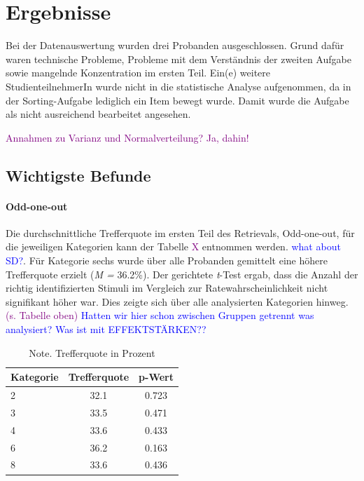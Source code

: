 \documentclass[preprint,12pt]{elsarticle}
\begin{document}
\section{Ergebnisse}
\label{S:3}
Bei der Datenauswertung wurden drei Probanden ausgeschlossen. Grund dafür waren technische Probleme, Probleme mit dem Verständnis der zweiten Aufgabe sowie mangelnde Konzentration im ersten Teil.
Ein(e) weitere StudienteilnehmerIn wurde nicht in die statistische Analyse aufgenommen, da in der Sorting-Aufgabe lediglich ein Item bewegt wurde. Damit wurde die Aufgabe als nicht ausreichend bearbeitet angesehen.

\textcolor{purple}{Annahmen zu Varianz und Normalverteilung? Ja, dahin!}

\subsection{Wichtigste Befunde}
\paragraph{Odd-one-out}
Die durchschnittliche Trefferquote im ersten Teil des Retrievals, Odd-one-out, für die jeweiligen Kategorien kann der Tabelle \textcolor{purple}{X} entnommen werden. \textcolor{blue}{what about SD?}. Für Kategorie sechs wurde über alle Probanden gemittelt eine höhere Trefferquote erzielt (\textit{M =} 36.2\%).
Der gerichtete \textit{t}-Test ergab, dass die Anzahl der richtig identifizierten Stimuli im Vergleich zur Ratewahrscheinlichkeit nicht signifikant höher war. Dies zeigte sich über alle analysierten Kategorien hinweg. \textcolor{purple}{(s. Tabelle oben)}
\textcolor{blue}{Hatten wir hier schon zwischen Gruppen getrennt was analysiert?}
\textcolor{blue}{Was ist mit EFFEKTSTÄRKEN??}

\begin{table}[h]
\centering
\begin{tabular}{l c c} %
\hline
\textbf{Kategorie} & \textbf{Trefferquote} & \textbf{p-Wert}\\
\hline
2 & 32.1 & 0.723\\
3 & 33.5 & 0.471\\
4 & 33.6 & 0.433\\
6 & 36.2 & 0.163\\
8 & 33.6 & 0.436\\
\hline
\end{tabular}
\caption{Note. Trefferquote in Prozent}
\end{table}
\end{document}
